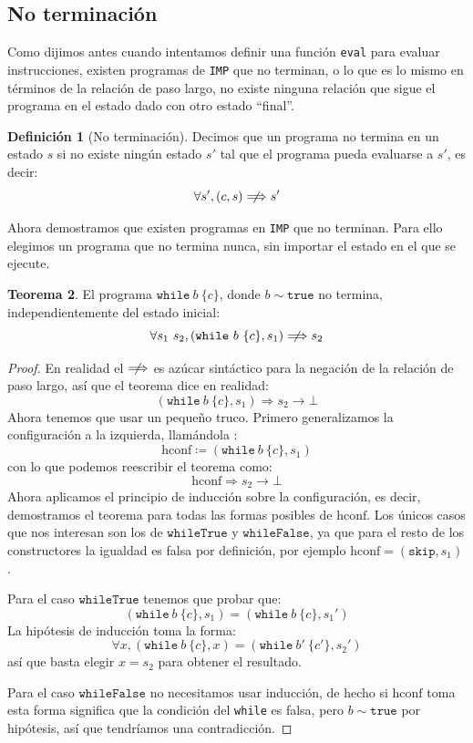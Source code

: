 \documentclass[
  a4paper, 
  10pt, 
  parskip=half, 
  toc=bibliography,
]{scrbook}
\theoremstyle{definition}
\theoremstyle{bolddef}
\newtheorem{theorem}{Teorema}[section]
\newtheorem{definition}[theorem]{Definición}
\newcommand{\funfont}[1]{\texttt{#1}}
\renewcommand{\implies}{\rightarrow}
\newcommand{\ImpWhile}[2]{\texttt{while} \ {#1} \ \{{#2}\}}
\newcommand{\ImpSkip}{\texttt{skip}}
\newcommand{\ImpTrue}{\texttt{true}}
\newcommand{\ImpName}{\texttt{IMP}}
\newcommand{\bigstep}{\Longrightarrow}
\begin{document}
\subsection{No terminación}\label{sec:non_termination}

Como dijimos antes cuando intentamos definir una función \funfont{eval} para
evaluar instrucciones, existen programas de \ImpName{} que no terminan, o lo que
es lo mismo en términos de la relación de paso largo, no existe ninguna 
relación que sigue el programa en el estado dado con otro estado \enquote{final}.

\begin{definition}[No terminación]
  Decimos que un programa no termina en un estado \(s\) si no existe ningún
  estado \(s'\) tal que el programa pueda evaluarse a \(s'\), es decir:
  \[
   \forall s', (c, s) \centernot \bigstep s'
  \]
\end{definition}

Ahora demostramos que existen programas en \ImpName{} que no terminan. Para
ello elegimos un programa que no termina nunca, sin importar el estado
en el que se ejecute.

\begin{theorem}\label{thm:non_termination}
  El programa \(\ImpWhile{b}{c}\), donde \(b \sim \ImpTrue\) no termina,
  independientemente del estado inicial:
  \[
  \forall s_1 \ s_2, (\ImpWhile{b}{c}, s_1) \centernot \bigstep s_2
  \]
\end{theorem}

\begin{proof}
  En realidad el \(\centernot \bigstep\) es azúcar sintáctico para
  la negación de la relación de paso largo, así que el teorema dice en realidad:
  \[
  (\ImpWhile{b}{c}, s_1) \bigstep s_2 \implies \bot
  \]
  Ahora tenemos que usar un pequeño truco. Primero generalizamos la configuración
  a la izquierda, llamándola :
  \[\text{hconf} \coloneqq (\ImpWhile{b}{c}, s_1)\] 
  con lo que podemos reescribir el teorema como:
  \[
  \text{hconf} \bigstep s_2 \implies \bot
  \]
  Ahora aplicamos el principio de inducción sobre la configuración, es decir,
  demostramos el teorema para todas las formas posibles de \(\text{hconf}\).
  Los únicos casos que nos interesan son los de \(\funfont{whileTrue}\) y
  \(\funfont{whileFalse}\), ya que para el resto de los constructores la
  igualdad es falsa por definición, por ejemplo \(\text{hconf} = (\ImpSkip, s_1)\).

  Para el caso \(\funfont{whileTrue}\) tenemos que probar que:
  \[
    (\ImpWhile{b}{c}, s_1) = (\ImpWhile{b}{c}, s_1')
  \]
  La hipótesis de inducción toma la forma:
  \[
    \forall x, (\ImpWhile{b}{c}, x) = (\ImpWhile{b'}{c'}, s_2')
  \]
  así que basta elegir \(x = s_2\) para obtener el resultado. 
  
  Para el caso \(\funfont{whileFalse}\) no necesitamos usar inducción, de hecho si
  \(\text{hconf}\) toma esta forma significa que la condición del \texttt{while} es
  falsa, pero \(b \sim \ImpTrue\) por hipótesis, así que tendríamos una
  contradicción.
\end{proof}
\end{document}
